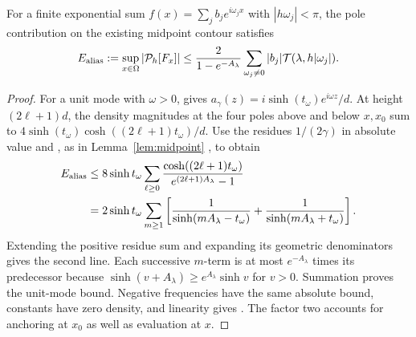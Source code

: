 \begin{proposition}
\label{prop:bandwidth-alias}
For a finite exponential sum $f(x)=\sum_j b_je^{i\omega_jx}$ with
$|h\omega_j|<\pi$, the pole contribution on the existing midpoint contour
satisfies
\begin{equation}
 E_{\rm alias}:=\sup_{x\in\Omega}|\mathcal P_h[F_x]|
 \le\frac{2}{1-e^{-A_\lambda}}
       \sum_{\omega_j\ne0}|b_j|\mathcal T(\lambda,h|\omega_j|).
 \label{eq:bandwidth-weighted-bound}
\end{equation}
\end{proposition}
\begin{proof}
For a unit mode with $\omega>0$,  gives
$a_\gamma(z)=i\sinh(t_\omega)e^{i\omega z}/d$. At height
$(2\ell+1)d$, the density magnitudes at the four poles above and below
$x,x_0$ sum to $4\sinh(t_\omega)\cosh((2\ell+1)t_\omega)/d$.
Use the residues $1/(2\gamma)$ in absolute value and
, as in Lemma~\ref{lem:midpoint}
\cite[Secs.~4--5]{JavedTrefethen2014}, to obtain
\begin{align*}
 E_{\rm alias}
 &\le8\sinh t_\omega\sum_{\ell\ge0}
       \frac{\cosh((2\ell+1)t_\omega)}{e^{(2\ell+1)A_\lambda}-1}\\
 &=2\sinh t_\omega\sum_{m\ge1}
       \left[\frac1{\sinh(mA_\lambda-t_\omega)}
             +\frac1{\sinh(mA_\lambda+t_\omega)}\right].
\end{align*}
Extending the positive residue sum and expanding its geometric denominators
gives the second line. Each successive $m$-term is at most
$e^{-A_\lambda}$ times its predecessor because
$\sinh(v+A_\lambda)\ge e^{A_\lambda}\sinh v$ for $v>0$.
Summation proves the unit-mode bound. Negative frequencies have the same
absolute bound, constants have zero density, and linearity gives
. The factor two accounts for anchoring
at $x_0$ as well as evaluation at $x$.
\end{proof}

